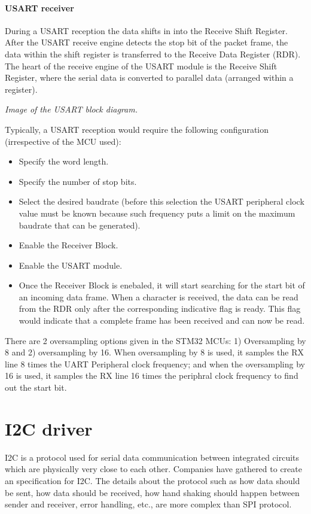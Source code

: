 \subsubsection{USART receiver}
During a USART reception the data shifts in into the Receive Shift Register. After the USART receive engine detects the stop bit of the packet frame, the data within the shift register is transferred to the Receive Data Register (RDR). The heart of the receive engine of the USART module is the Receive Shift Register, where the serial data is converted to parallel data (arranged within a register).

\begin{center}
\textit{Image of the USART block diagram.}
\end{center}

\noindent Typically, a USART reception would require the following configuration (irrespective of the MCU used):

\begin{itemize}
	\item	Specify the word length.
	\item	Specify the number of stop bits.
	\item	Select the desired baudrate (before this selection the USART peripheral clock value must be known because such frequency puts a limit on the maximum baudrate that can be generated).
	\item	Enable the Receiver Block.
	\item	Enable the USART module.
	\item	Once the Receiver Block is enebaled, it will start searching for the start bit of an incoming data frame. When a character is received, the data can be read from the RDR only after the corresponding indicative flag is ready. This flag would indicate that a complete frame has been received and can now be read.
\end{itemize}

\noindent There are 2 oversampling options given in the STM32 MCUs: 1) Oversampling by 8 and 2) oversampling by 16. When oversampling by 8 is used, it samples the RX line 8 times the UART Peripheral clock frequency; and when the oversampling by 16 is used, it samples the RX line 16 times the periphral clock frequency to find out the start bit.


\chapter{I2C driver}
I2C is a protocol used for serial data communication between integrated circuits which are physically very close to each other. Companies have gathered to create an specification for I2C. The details about the protocol such as how data should be sent, how data should be received, how hand shaking should happen between sender and receiver, error handling, etc., are more complex than SPI protocol.

